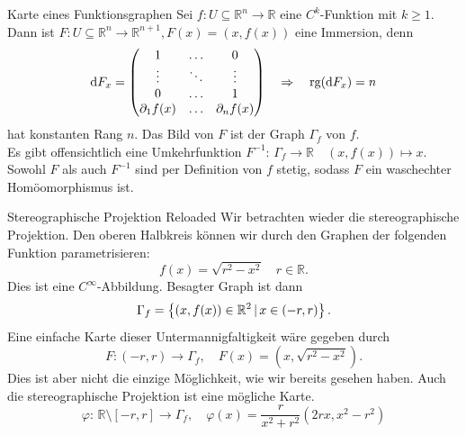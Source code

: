 \begin{Beispiel}
    {Karte eines Funktionsgraphen}
    Sei $f: U\subseteq\mathbb{R}^n\rightarrow\mathbb{R}$ eine $C^k$-Funktion mit $k\geq 1$. Dann ist $F:U\subseteq\mathbb{R}^n\rightarrow\mathbb{R}^{n+1}, F(x)=(x,f(x))$ eine Immersion, denn
    \begin{equation*}
        \text{d}F_x=\begin{pmatrix}1 & \ldots & 0 \\ \vdots & \ddots & \vdots \\ 0 & \ldots & 1 \\ \partial_1 f(x) & \ldots & \partial_n f(x)\end{pmatrix} \quad \Rightarrow \quad \text{rg}(\text{d}F_x) = n
    \end{equation*}
    hat konstanten Rang $n$. Das Bild von $F$ ist der Graph $\Gamma_f$ von $f$. \\
    Es gibt offensichtlich eine Umkehrfunktion $F^{-1}:\,\Gamma_f\rightarrow\mathbb{R}\quad(x,f(x))\mapsto x$. Sowohl $F$ als auch $F^{-1}$ sind per Definition von $f$ stetig, sodass $F$ ein waschechter Homöomorphismus ist.
\end{Beispiel}
\begin{Beispiel}
    {Stereographische Projektion Reloaded}
    Wir betrachten wieder die stereographische Projektion. Den oberen Halbkreis können wir durch den Graphen der folgenden Funktion parametrisieren:
    \begin{equation*}
        f(x)=\sqrt{r^2-x^2} \quad r\in\mathbb{R}.
    \end{equation*}
    Dies ist eine $C^\infty$-Abbildung. Besagter Graph ist dann
    \begin{equation*}
        \Gamma_f=\left\{(x,f(x))\in\mathbb{R}^2\,|\, x\in(-r,r)\right\}.
    \end{equation*}
    Eine einfache Karte dieser Untermannigfaltigkeit wäre gegeben durch
    \begin{equation*}
        F:(-r,r)\rightarrow\Gamma_f, \quad F(x)=(x,\sqrt{r^2-x^2}).
    \end{equation*}
    Dies ist aber nicht die einzige Möglichkeit, wie wir bereits gesehen haben. Auch die stereographische Projektion ist eine mögliche Karte.
    \begin{equation*}
        \varphi:\,\mathbb{R}\setminus[-r,r]\longrightarrow \Gamma_f, \quad \varphi(x)=\frac{r}{x^2+r^2}(2rx, x^2-r^2)
    \end{equation*}
\end{Beispiel}


